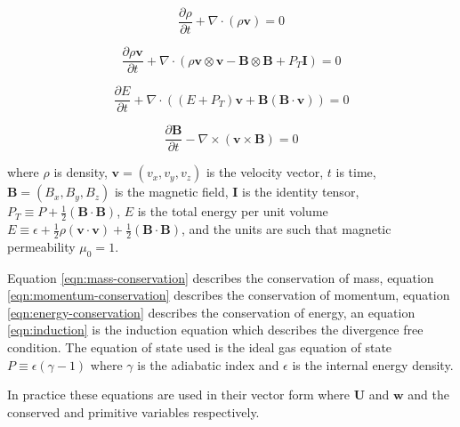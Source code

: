 \begin{equation}
    \label{eqn:mass-conservation}
    \frac{\partial \rho}{\partial t} + \nabla \cdot (\rho \boldsymbol{v}) = 0
\end{equation}

\begin{equation}
    \label{eqn:momentum-conservation}
    \frac{\partial \rho\boldsymbol{v}}{\partial t} + \nabla \cdot (\rho \boldsymbol{v}\otimes\boldsymbol{v} - \boldsymbol{B}\otimes\boldsymbol{B} + P_T\boldsymbol{I}) = 0
\end{equation}

\begin{equation}
    \label{eqn:energy-conservation}
    \frac{\partial E}{\partial t} + \nabla \cdot ( (E + P_T) \boldsymbol{v} + \boldsymbol{B}(\boldsymbol{B}\cdot\boldsymbol{v}) ) = 0
\end{equation}

\begin{equation}
    \label{eqn:induction}
    \frac{\partial \boldsymbol{B}}{\partial t} - \nabla \times (\boldsymbol{v} \times \boldsymbol{B}) = 0
\end{equation}

where $\rho$ is density, $\boldsymbol{v} = ( v_x, v_y, v_z)$ is the velocity vector, $t$ is time, $\boldsymbol{B} = ( B_x, B_y, B_z)$ is the magnetic field, $\boldsymbol{I}$ is the identity tensor, $P_T \equiv P + \frac{1}{2}(\boldsymbol{B} \cdot \boldsymbol{B})$, $E$ is the total energy per unit volume $E \equiv \epsilon + \frac{1}{2}\rho(\boldsymbol{v}\cdot\boldsymbol{v}) + \frac{1}{2}(\boldsymbol{B}\cdot\boldsymbol{B})$, and the units are such that magnetic permeability $\mu_0 = 1$. 

Equation \ref{eqn:mass-conservation} describes the conservation of mass, equation \ref{eqn:momentum-conservation} describes the conservation of momentum, equation \ref{eqn:energy-conservation} describes the conservation of energy, an equation \ref{eqn:induction} is the induction equation which describes the divergence free condition. The equation of state used is the ideal gas equation of state $P \equiv \epsilon(\gamma - 1)$ where $\gamma$ is the adiabatic index and $\epsilon$ is the internal energy density. 

In practice these equations are used in their vector form where $\boldsymbol{U}$ and $\boldsymbol{w}$ and the conserved and primitive variables respectively. 

